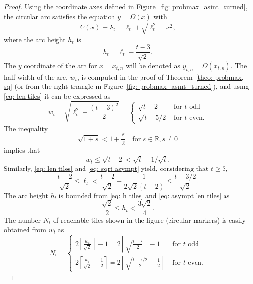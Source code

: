 \documentclass[12pt, a4paper]{article}
\newcommand{\len}{\ell} %
\newcommand{\tiles}{t} %
\newcommand{\genvar}{s}
\newcommand{\funcirc}{\Omega}
\begin{document}
\begin{proof}
Using the coordinate axes defined in Figure~\ref{fig: probmax_asint_turned}, the circular arc satisfies the equation $y = \funcirc(x)$ with
\begin{equation}
\label{eq: funcirc}
\funcirc(x) = h_\tiles - \len_\tiles + \sqrt{\len_\tiles^2-x^2},
\end{equation}
where the arc height $h_\tiles$ is 
\begin{equation}
\label{eq: h tiles}
h_\tiles = \len_\tiles - \frac{\tiles-3}{\sqrt{2}}.
\end{equation}
The $y$ coordinate of the arc for $x=x_{\tiles,n}$ will be denoted as $y_{\tiles,n} = \funcirc(x_{\tiles,n})$. The half-width of the arc, $w_\tiles$, is computed in the proof of Theorem~\ref{theo: probmax, sq} (or from the right triangle in Figure~\ref{fig: probmax_asint_turned}), and using \eqref{eq: len tiles} it can be expressed as
\begin{equation}
\label{eq: w}
w_\tiles = \sqrt{\len_\tiles^2-\frac{(\tiles-3)^2}{2}} =
\begin{cases}
\displaystyle
\sqrt{\tiles-2} & \text{ for $\tiles$ odd} \\
\displaystyle
\sqrt{\tiles-5/2} & \text{ for $\tiles$ even}.
\end{cases}
\end{equation}
The inequality
\begin{equation}
\label{eq: sqrt asympt}
\sqrt{1+\genvar} < 1 + \frac \genvar 2 \quad\text{for } s \in \mathbb R, s \neq 0
\end{equation}
implies that
\begin{equation}
\label{eq: asympt w}
w_\tiles \leq \sqrt{\tiles-2} < \sqrt{\tiles} - 1/\sqrt\tiles.
\end{equation}
Similarly, \eqref{eq: len tiles} and \eqref{eq: sqrt asympt} yield, considering that $\tiles \geq 3$,
\begin{equation}
\label{eq: asympt len tiles}
\frac{\tiles-2}{\sqrt{2}} \leq \len_\tiles < \frac{\tiles-2}{\sqrt{2}} + \frac{1}{2\sqrt{2}(\tiles-2)}
\leq \frac{\tiles-3/2}{\sqrt{2}}.
\end{equation}
The arc height $h_\tiles$ is bounded from \eqref{eq: h tiles} and \eqref{eq: asympt len tiles} as
\begin{equation}
\label{eq: h bound}
\frac {\sqrt{2}} 2 \leq h_\tiles <
\frac{3\sqrt{2}}{4}.
\end{equation}
The number $N_\tiles$ of reachable tiles shown in the figure (circular markers) is easily obtained from $w_\tiles$ as
\begin{equation}
\label{eq: N tiles}
N_\tiles = 
\begin{cases}
\displaystyle
2\left\lceil \frac{w_\tiles}{\sqrt{2}} \right\rceil - 1 = 2\left\lceil \sqrt{\frac{\tiles-2}{2}} \right\rceil - 1 & \text{ for $\tiles$ odd} \\[5mm] %
\displaystyle
2\left\lceil \frac{w_\tiles}{\sqrt{2}} - \frac 1 2 \right\rceil = 2\left\lceil \sqrt{\frac{\tiles-5/2}{2}} - \frac 1 2 \right\rceil & \text{ for $\tiles$ even}.
\end{cases}
\end{equation}


\end{proof}
\end{document}
